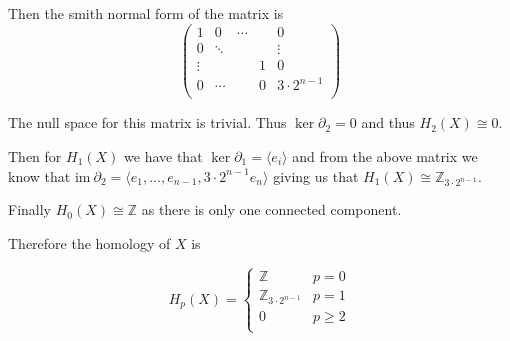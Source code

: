 \documentclass[10pt]{article}
\newcommand{\bb}[1]{\mathbb{#1}}
\newcommand{\ima}{\mathrm{im}\ }
\theoremstyle{plain}
\theoremstyle{remark}
\begin{document}
Then the smith normal form of the matrix is
\[
  \left(
    \begin{array}{ccccc}
      1&0&\cdots&&0\\
      0&\ddots&&&\vdots\\
      \vdots&&&1&0\\
      0&\cdots&&0&3\cdot 2^{n-1}\\
    \end{array}
  \right)
\]

The null space for this matrix is trivial. Thus $\ker \partial_2=0$ and
thus $H_2(X)\cong 0$.

Then for $H_1(X)$ we have that $\ker\partial_1=\langle e_i\rangle$ and from the above
matrix we know that $\ima \partial_2=\langle e_1,\ldots,e_{n-1},3\cdot 2^{n-1}e_n\rangle$
giving us that $H_1(X)\cong \bb{Z}_{3\cdot 2^{n-1}}$.

Finally $H_0(X)\cong \bb{Z}$ as there is only one connected component.

Therefore the homology of $X$ is

\[
  H_p(X) =
  \left\{
    \begin{array}{lr}
      \bb{Z}& p=0\\
      \bb{Z}_{3\cdot 2^{n-1}} & p=1\\
      0 & p\geq 2\\
    \end{array}
  \right.
\]


\end{document}
